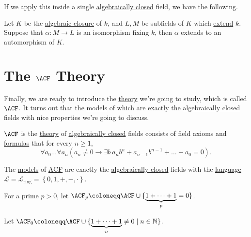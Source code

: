 If we apply this inside a single \hyperref[def:algebraically-closed]{algebraically closed} field, we have the following.

\begin{theorem}
	Let \(K\) be the \hyperref[def:algebraic-closure]{algebraic closure} of \(k\), and \(L, M\) be subfields of \(K\) which \hyperref[def:field-extension]{extend} \(k\). Suppose that \(\alpha \colon M \to L\) is an isomorphism fixing \(k\), then \(\alpha \) extends to an automorphism of \(K\).
\end{theorem}

\section{The \(\ACF\) Theory}
Finally, we are ready to introduce the \hyperref[def:theory]{theory} we're going to study, which is called \(\ACF\). It turns out that the \hyperref[def:model]{models} of which are exactly the \hyperref[def:algebraically-closed]{algebraically closed} fields with nice properties we're going to discuss.

\begin{definition}[\(\ACF\)]\label{def:ACF}
	\(\ACF\) is the \hyperref[def:theory]{theory} of \hyperref[def:algebraically-closed]{algebraically closed} fields consists of field axioms and \hyperref[def:formula]{formulas} that for every \(n \geq 1\),
	\[
		\forall a_0 \dots \forall a_n \left( a_n \neq 0 \to \exists b\ a_n b^n + a_{n-1} b^{n-1} + \dots + a_0 = 0\right) .
	\]
\end{definition}

\begin{remark}
	The \hyperref[def:model]{models} of \hyperref[def:ACF]{ACF} are exactly the \hyperref[def:algebraically-closed]{algebraically closed} fields with the \hyperref[def:language]{language} \(\mathcal{L} = \mathcal{L} _{\text{ring} } = \left\{ 0, 1, +, -, \cdot \right\} \).
\end{remark}

\begin{notation}[\(\ACF_p\)]
	For a prime \(p > 0\), let \(\ACF_p \coloneqq \ACF \cup \{\underbrace{1+\dots +1}_{p} = 0\}\).
\end{notation}

\begin{notation}[\(\ACF_0\)]
	Let \(\ACF_0 \coloneqq \ACF \cup \{\underbrace{1+\dots +1}_n \neq 0 \mid n\in \mathbb{N} \}\).
\end{notation}

